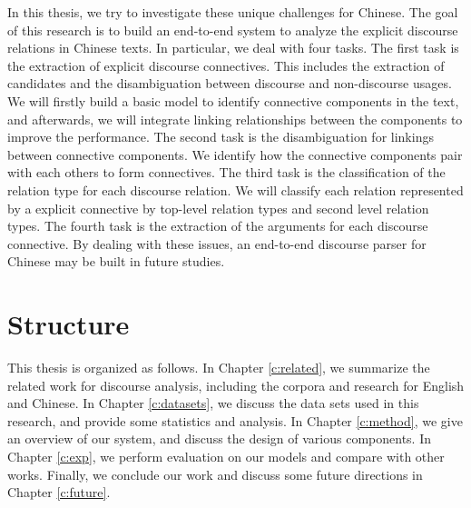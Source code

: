 In this thesis, we try to investigate these unique challenges for Chinese.
The goal of this research is to build an end-to-end system to analyze
the explicit discourse relations in Chinese texts. In particular, we
deal with four tasks. The first task is the extraction of explicit discourse
connectives. This includes the extraction of candidates and the disambiguation
between discourse and non-discourse usages. We will firstly build a basic model
to identify connective components in the text, and afterwards, we will
integrate linking relationships between the components to improve the performance.
The second task is the disambiguation for linkings between connective components.
We identify how the connective components pair with each others to form connectives.
The third task is the classification of the relation type for each discourse relation.
We will classify each relation represented by a explicit connective by top-level
relation types and second level relation types.
The fourth task is the extraction of the arguments for each discourse connective.
By dealing with these issues, an end-to-end discourse parser for Chinese may
be built in future studies.

%
%
\section{Structure}
This thesis is organized as follows. In Chapter \ref{c:related}, we summarize
the related work for discourse analysis, including the corpora and research for
English and Chinese. In Chapter \ref{c:datasets}, we discuss the data sets used in
this research, and provide some statistics and analysis. In Chapter \ref{c:method},
we give an overview of our system, and discuss the design of various components.
In Chapter \ref{c:exp}, we perform evaluation on our models and compare with
other works. Finally, we conclude our work and discuss some future directions in
Chapter \ref{c:future}.
